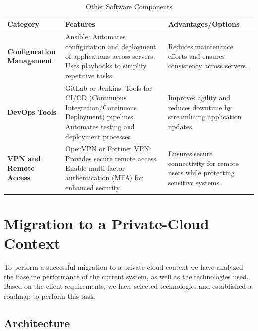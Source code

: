 \documentclass{llncs}
\begin{document}
\begin{table}[H]
\setlength{\tabcolsep}{5pt} %
\renewcommand{\arraystretch}{1.2} %
\centering
\begin{tabular}{|p{4cm}|p{6cm}|p{5cm}|}
\hline
\textbf{Category} & \textbf{Features} & \textbf{Advantages/Options} \\
\hline

\textbf{Configuration Management} & 
Ansible: Automates configuration and deployment of applications across servers. Uses playbooks to simplify repetitive tasks. &
Reduces maintenance efforts and ensures consistency across servers. \\
\hline

\textbf{DevOps Tools} & 
GitLab or Jenkins: Tools for CI/CD (Continuous Integration/Continuous Deployment) pipelines. Automates testing and deployment processes. &
Improves agility and reduces downtime by streamlining application updates. \\
\hline

\textbf{VPN and Remote Access} & 
OpenVPN or Fortinet VPN: Provides secure remote access. Enable multi-factor authentication (MFA) for enhanced security. &
Ensures secure connectivity for remote users while protecting sensitive systems. \\
\hline

\end{tabular}
\caption{Other Software Components}
\label{tab:software_components}
\end{table}
\section{Migration to a Private-Cloud Context}

To perform a successful migration to a private cloud context we have analyzed the baseline performance of the current system, as well as the technologies used. Based on the client requirements, we have selected technologies and established a roadmap to perform this task.   

\subsection{Architecture}
\end{document}
